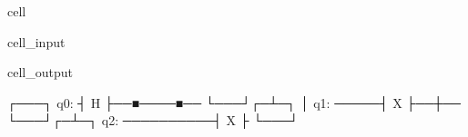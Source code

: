 \documentclass[letterpaper,10pt,english]{jupyterBook}
\begin{document}
\begin{sphinxuseclass}{cell}\begin{sphinxVerbatimInput}

\begin{sphinxuseclass}{cell_input}
\begin{sphinxVerbatim}[commandchars=\\\{\}]
   



\end{sphinxVerbatim}

\end{sphinxuseclass}\end{sphinxVerbatimInput}
\begin{sphinxVerbatimOutput}

\begin{sphinxuseclass}{cell_output}
\begin{sphinxVerbatim}[commandchars=\\\{\}]
     ┌───┐
q\PYGZus{}0: ┤ H ├──■────■──
     └───┘┌─┴─┐  │
q\PYGZus{}1: ─────┤ X ├──┼──
          └───┘┌─┴─┐
q\PYGZus{}2: ──────────┤ X ├
               └───┘
\end{sphinxVerbatim}

\end{sphinxuseclass}\end{sphinxVerbatimOutput}

\end{sphinxuseclass}
\end{document}
